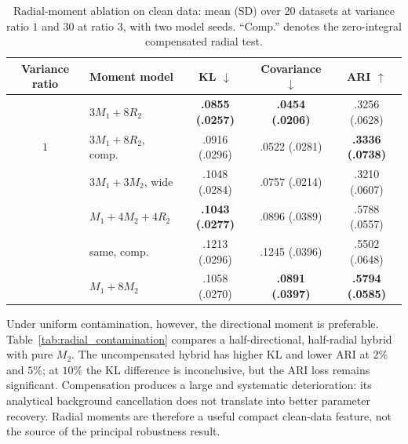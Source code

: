 \documentclass[11pt,a4paper]{article}
\newcommand{\best}[1]{\textbf{#1}}
\newcommand{\Mone}{M_1}
\newcommand{\Mtwo}{M_2}
\newcommand{\Rtwo}{R_2}
\begin{document}
\begin{table}[ht]
\centering
\scriptsize
\caption{Radial-moment ablation on clean data: mean (SD) over 20 datasets at
variance ratio $1$ and 30 at ratio $3$, with two model seeds.  ``Comp.''
denotes the zero-integral compensated radial test.}
\label{tab:radial_clean}
\begin{tabular}{@{}c l c c c@{}}
\toprule
Variance ratio & Moment model & KL $\downarrow$ & Covariance $\downarrow$ & ARI $\uparrow$ \\
\midrule
\multirow{3}{*}{$1$}
 & $3\Mone+8\Rtwo$ & \best{.0855 (.0257)} & \best{.0454 (.0206)} & .3256 (.0628) \\
 & $3\Mone+8\Rtwo$, comp. & .0916 (.0296) & .0522 (.0281) & \best{.3336 (.0738)} \\
 & $3\Mone+3\Mtwo$, wide & .1048 (.0284) & .0757 (.0214) & .3210 (.0607) \\
\addlinespace
\multirow{3}{*}{$3$}
 & $\Mone+4\Mtwo+4\Rtwo$ & \best{.1043 (.0277)} & .0896 (.0389) & .5788 (.0557) \\
 & same, comp. & .1213 (.0296) & .1245 (.0396) & .5502 (.0648) \\
 & $\Mone+8\Mtwo$ & .1058 (.0270) & \best{.0891 (.0397)} & \best{.5794 (.0585)} \\
\bottomrule
\end{tabular}
\end{table}

Under uniform contamination, however, the directional moment is preferable.
Table~\ref{tab:radial_contamination} compares a half-directional,
half-radial hybrid with pure $\Mtwo$.  The uncompensated hybrid has higher KL
and lower ARI at $2\%$ and $5\%$; at $10\%$ the KL difference is inconclusive,
but the ARI loss remains significant.  Compensation produces a large and
systematic deterioration: its analytical background cancellation does not
translate into better parameter recovery.  Radial moments are therefore a
useful compact clean-data feature, not the source of the principal robustness
result.
\end{document}
